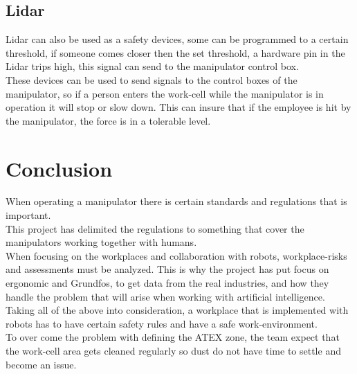 \subsection{Lidar}
Lidar can also be used as a safety devices\cite{Lidar}, some can be programmed to a certain threshold, if someone comes closer then the set threshold, a hardware pin in the Lidar trips high, this signal can send to the manipulator control box.\\ 

These devices can be used to send signals to the control boxes of the manipulator, so if a person enters the work-cell while the manipulator is in operation it will stop or slow down. This can insure that if the employee is hit by the manipulator, the force is in a tolerable level.\\

\section{Conclusion}

When operating a manipulator there is certain standards and regulations that is important.\\
This project has delimited the regulations to something that cover the manipulators working together with humans.\\
When focusing on the workplaces and collaboration with robots, workplace-risks and assessments must be analyzed. This is why the project has put focus on ergonomic and Grundfos, to get data from the real industries, and how they handle the problem that will arise when working with artificial intelligence.\\
Taking all of the above into consideration, a workplace that is implemented with robots has to have certain safety rules and have a safe work-environment.\\
To over come the problem with defining the ATEX zone, the team expect that the work-cell area gets cleaned regularly so dust do not have time to settle and become an issue.\\
